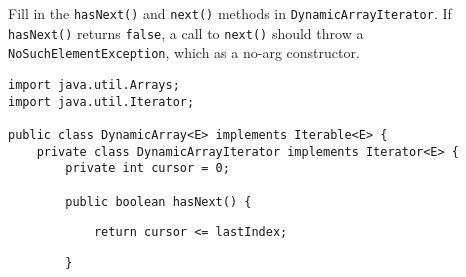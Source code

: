 \documentclass[addpoints,9pt]{exam}
\begin{document}
\begin{questions}

\newpage

\question[10] Fill in the {\tt hasNext()} and {\tt next()} methods in {\tt DynamicArrayIterator}.  If {\tt hasNext()} returns {\tt false}, a call to {\tt next()} should throw a {\tt NoSuchElementException}, which as a no-arg constructor.

\begin{verbatim}
import java.util.Arrays;
import java.util.Iterator;

public class DynamicArray<E> implements Iterable<E> {
    private class DynamicArrayIterator implements Iterator<E> {
        private int cursor = 0;

        public boolean hasNext() {
\end{verbatim}
\ifprintanswers
\begin{lstlisting}
            return cursor <= lastIndex;
\end{lstlisting}
\else
\vspace{.3in}
\fi
\begin{verbatim}
        }


\end{verbatim}
\end{questions}
\end{document}
